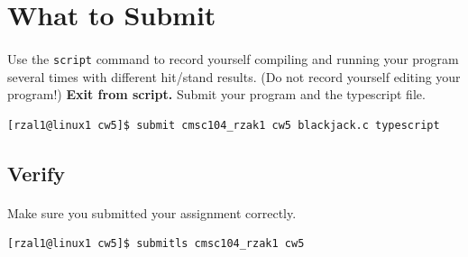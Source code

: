 \documentclass[letter,11pt]{article}
\begin{document}
\section*{What to Submit}
\paragraph{}Use the \texttt{script} command to record yourself compiling and running your program several times with different hit/stand results. (Do not record yourself editing your program!) \textbf{Exit from script.} Submit your program and the typescript file.
\begin{verbatim}
[rzal1@linux1 cw5]$ submit cmsc104_rzak1 cw5 blackjack.c typescript
\end{verbatim}

\newpage
\subsection*{Verify}
\paragraph{}Make sure you submitted your assignment correctly.
\begin{verbatim}
[rzal1@linux1 cw5]$ submitls cmsc104_rzak1 cw5
\end{verbatim}
\end{document}
